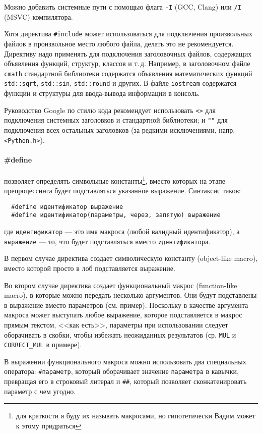 {\small Можно добавить системные пути с помощью флага \verb|-I| (GCC, Clang) или \verb|/I| (MSVC) компилятора. }

Хотя директива \verb|#include| может использоваться для подключения произвольных файлов в произвольное место
любого файла, делать это не рекомендуется. Директиву надо применять для подключения заголовочных файлов, содержащих
объявления функций, структур, классов и т.\,д. Например, в заголовочном файле \verb|cmath|
стандартной библиотеки содержатся объявления математических функций \verb|std::sqrt|, \verb|std::sin|,
\verb|std::round| и других. В файле \verb|iostream| содержатся функции и структуры для ввода-вывода информации
в консоль.

Руководство Google по стилю кода рекомендует использовать \verb|<>| для подключения системных заголовков
и стандартной библиотеки; и \verb|""| для подключения всех остальных заголовков (за редкими исключениями, напр. \verb|<Python.h>|).

\paragraph{\#define} позволяет определять символьные константы\footnote{для краткости я буду их называть макросами,
но гипотетически Вадим может к этому придраться}, вместо которых на этапе препроцессинга
будет подставляться указанное выражение.
Синтаксис таков:
\begin{verbatim}
  #define идентификатор выражение
  #define идентификатор(параметры, через, запятую) выражение
\end{verbatim}
где \verb|идентификатор| --- это имя макроса (любой валидный идентификатор),
а \verb|выражение| --- то, что будет подставляться вместо \verb|идентификатор|а.

В первом случае директива создает символическую константу (object-like macro),
вместо которой просто в лоб подставляется выражение.

Во втором случае директива создает функциональный макрос (function-like macro),
в которые можно передать несколько аргументов. Они будут подставлены в выражение
вместо параметров (см. пример). Поскольку в качестве аргумента макроса может
выступать любое выражение, которое подставляется в макрос прямым текстом, <<как есть>>,
параметры при использовании следует оборачивать в скобки, чтобы избежать неожиданных результатов
(ср. \verb|MUL| и \verb|CORRECT_MUL| в примере).

В выражении функционального макроса можно использовать два специальных оператора:
\verb|#параметр|, который оборачивает значение \verb|параметра| в кавычки,
превращая его в строковый литерал и \verb|##|, который позволяет сконкатенировать
параметр с чем угодно.

